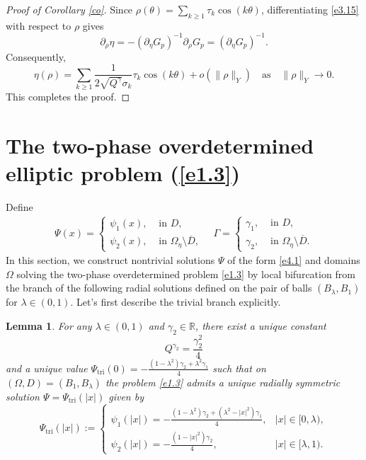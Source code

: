 \documentclass[reqno]{amsart}
\numberwithin{equation}{section}
\newtheorem{lemma}[theorem]{Lemma}
\numberwithin{equation}{section}
\numberwithin{equation}{section}
\begin{document}
\begin{proof}[Proof of Corollary \ref{co}]
Since \(\rho(\theta) = \sum_{k \geq 1} \tau_k \cos(k\theta)\), differentiating \eqref{e3.15} with respect to \(\rho\) gives
\[
\partial_\rho \eta = -(\partial_\eta G_p)^{-1} \partial_\rho G_p = (\partial_\eta G_p)^{-1}.
\]
Consequently,
\[
\eta(\rho) = \sum_{k \geq 1} \frac{1}{2\sqrt{Q^{\gamma}}\sigma_k} \tau_k \cos(k\theta) + o(\|\rho\|_Y) \quad \text{as} \quad \|\rho\|_Y \to 0.
\]
This completes the proof.
\end{proof}




\medskip
\section{The two-phase overdetermined elliptic problem (\ref{e1.3})}

Define
\begin{eqnarray}\label{e4.1}
\Psi(x)=\left\{\begin{array}{ll}{\psi_1(x)},  & {\text { in } D}, \\
{\psi_2(x)}, & {\text { in } \Omega_{\eta} \setminus\overline{D}},\end{array}\right.  \quad
\Gamma=\left\{\begin{array}{ll}{\gamma_1},  & {\text { in } D}, \\
{\gamma_2}, & {\text { in } \Omega_{\eta} \setminus\overline{D}}.\end{array}\right.
\end{eqnarray}
In this section, we construct nontrivial solutions \(\Psi\) of the form \eqref{e4.1} and domains \(\Omega\) solving the two-phase overdetermined problem \eqref{e1.3} by local bifurcation from the branch of the following radial solutions defined on the pair of balls \((B_\lambda, B_1)\) for $\lambda\in (0,1)$.
Let's first describe the trivial branch explicitly.

\begin{lemma}
For any \(\lambda \in (0,1)\) and \(\gamma_2 \in \mathbb{R}\), there exist a unique constant
\[
Q^{\gamma_2} = \frac{\gamma_2^2}{4}
\]
and a unique value \(\Psi_\mathrm{tri}(0) = -\frac{(1-\lambda^2)\gamma_2 + \lambda^2 \gamma_1}{4}\) such that on \((\Omega, D) = (B_1, B_\lambda)\) the problem \eqref{e1.3} admits a unique radially symmetric solution \(\Psi = \Psi_\mathrm{tri}(|x|)\) given by
\begin{equation}\label{e4.2}
\Psi_\mathrm{tri}(|x|) :=
\begin{cases}
\psi_1(|x|) = -\frac{(1-\lambda^2)\gamma_2 + (\lambda^2 - |x|^2)\gamma_1}{4}, & |x| \in [0,\lambda), \\
\psi_2(|x|) = -\frac{(1 - |x|^2)\gamma_2}{4}, & |x| \in [\lambda,1).
\end{cases}
\end{equation}
\end{lemma}
\end{document}
